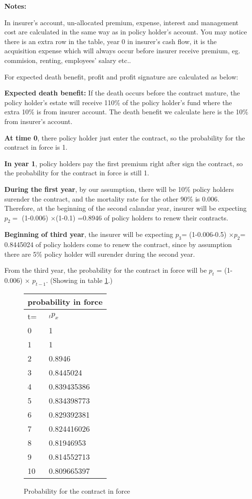 \documentclass{report}
\begin{document}
\textbf{Notes:}

In insurer's account, un-allocated premium, expense, interest and management cost are calculated in the same way as in policy holder's account. You may notice there is an extra row in the table, year 0 in insurer's cash flow, it is the acquisition expense which will always occur before insurer receive premium, eg. commision, renting, employees' salary etc..

For expected death benefit, profit and profit signature are calculated as below:

\textbf{Expected death benefit:} If the death occurs before the contract mature, the policy holder's estate will receive 110\% of the policy holder's fund where the extra 10\% is from insurer account. The death benefit we calculate here is the 10\% from insurer's account. 

\textbf{At time 0}, there policy holder just enter the contract, so the probability for the contract in force is 1.

\textbf{In year 1}, policy holders pay the first premium right after sign the contract, so the probability for the contract in force is still 1. 

\textbf{During the first year}, by our assumption, there will be 10\% policy holders surender the contract, and the mortality rate for the other 90\% is 0.006. Therefore, at the beginning of the second calandar year, insurer will be expecting $p_2=$ (1-0.006) $\times$(1-0.1) =0.8946 of policy holders to renew their contracts. 

\textbf{Beginning of third year}, the insurer will be expecting $p_3$= (1-0.006-0.5) $\times$$p_2$= 0.8445024 of policy holders come to renew the contract, since by assumption there are 5\% policy holder will surender during the second year.

From the third year, the probability for the contract in force will be $p_t$ = (1-0.006) $\times$ $p_{t-1}$. (Showing in table \ref{determ-prob-in-force}.)


\begin{figure}[H]
\begin{tabular}{|l|l|}
  \hline
  \multicolumn{2}{|c|}{probability in force} \\
  \hline
t=	& $_t p_x$\\
\hline
0	&1\\
1	&1\\
2	&0.8946\\
3	&0.8445024\\
4	&0.839435386\\
5	&0.834398773\\
6	&0.829392381\\
7	&0.824416026\\
8	&0.81946953\\
9	&0.814552713\\
10	&0.809665397\\
  \hline
\end{tabular}
\caption{Probability for the contract in force}
\label{determ-prob-in-force}
\end{figure}
\end{document}
